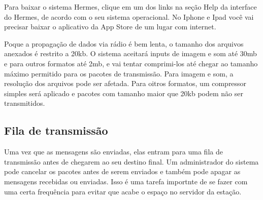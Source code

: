 \documentclass[11pt,a4paper]{article}
\begin{document}


Para baixar o sistema Hermes, clique em um dos links na seção Help da interface do Hermes, de acordo com o seu sistema operacional. No Iphone e Ipad você vai precisar baixar o aplicativo da App Store de um lugar com internet.


Poque a propagação de dados via rádio é bem lenta, o tamanho dos arquivos anexados é restrito a 20kb. O sistema aceitará inputs de imagem e som até 30mb e para outros formatos até 2mb, e vai tentar comprimi-los até chegar ao tamanho máximo permitido para os pacotes de transmissão. Para imagem e som, a resolução dos arquivos pode ser afetada. Para oitros formatos, um compressor simples será aplicado e pacotes com tamanho maior que 20kb podem não ser transmitidos. 




\subsection{Fila de transmissão}

Uma vez que as mensagens são enviadas, elas entram para uma fila de transmissão antes de chegarem ao seu destino final. Um administrador do sistema pode cancelar os pacotes antes de serem enviados e também pode apagar as mensagens recebidas ou enviadas. Isso é uma tarefa importnte de se fazer com uma certa frequência para evitar que acabe o espaço no servidor da estação.
\end{document}

